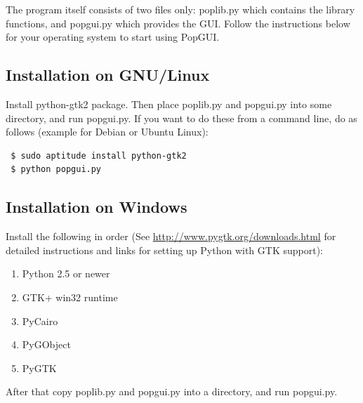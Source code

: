 \documentclass[urop]{socreport}
\begin{document}
The program itself consists of two files only: poplib.py which contains the library functions, and popgui.py which provides the GUI. Follow the instructions below for your operating system to start using PopGUI.

\subsection{Installation on GNU/Linux}
Install python-gtk2 package. Then place poplib.py and popgui.py into some directory, and run popgui.py. If you want to do these from a command line, do as follows (example for Debian or Ubuntu Linux):
\begin{verbatim}
 $ sudo aptitude install python-gtk2
 $ python popgui.py
\end{verbatim}

\subsection{Installation on Windows}
Install the following in order (See \url{http://www.pygtk.org/downloads.html} for detailed instructions and links for setting up Python with GTK support):
\begin{enumerate}
\item Python 2.5 or newer
\item GTK+ win32 runtime
\item PyCairo
\item PyGObject
\item PyGTK
\end{enumerate}

After that copy poplib.py and popgui.py into a directory, and run popgui.py.



\end{document}
